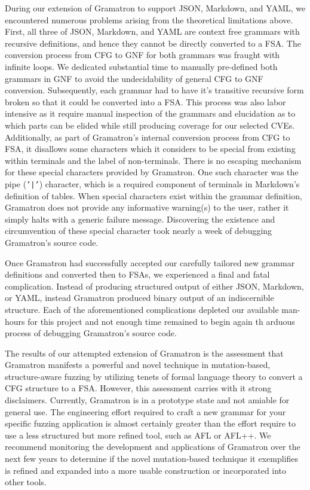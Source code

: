 \documentclass[12pt]{diazessay}
\begin{document}
During our extension of Gramatron to support JSON, Markdown, and YAML, we encountered numerous problems arising from the theoretical limitations above.
First, all three of JSON, Markdown, and YAML are context free grammars with recursive definitions, and hence they cannot be directly converted to a FSA.
The conversion process from CFG to GNF for both grammars was fraught with infinite loops.
We dedicated substantial time to manually pre-defined both grammars in GNF to avoid the undecidability of general CFG to GNF conversion.
Subsequently, each grammar had to have it's transitive recursive form broken so that it could be converted into a FSA.
This process was also labor intensive as it require manual inspection of the grammars and elucidation as to which parts can be elided while still producing coverage for our selected CVEs.
Additionally, as part of Gramatron's internal conversion process from CFG to FSA, it disallows some characters which it considers to be special from existing within terminals and the label of non-terminals.
There is no escaping mechanism for these special characters provided by Gramatron.
One such character was the pipe (\texttt{'|'}) character, which is a required component of terminals in Markdown's definition of tables.
When special characters exist within the grammar definition, Gramatron does not provide any informative warning(s) to the user, rather it simply halts with a generic failure message.
Discovering the existence and circumvention of these special character took nearly a week of debugging Gramatron's source code.

Once Gramatron had successfully accepted our carefully tailored new grammar definitions and converted then to FSAs, we experienced a final and fatal complication.
Instead of producing structured output of either JSON, Markdown, or YAML, instead Gramatron produced binary output of an indiscernible structure.
Each of the aforementioned complications depleted our available man-hours for this project and not enough time remained to begin again th arduous process of debugging Gramatron's source code.

The results of our attempted extension of Gramatron is the assessment that Gramatron manifests a powerful and novel technique in mutation-based, structure-aware fuzzing by utilizing tenets of formal language theory to convert a CFG structure to a FSA.
However, this assessment carries with it strong disclaimers.
Currently, Gramatron is in a prototype state and not amiable for general use. 
The engineering effort required to craft a new grammar for your specific fuzzing application is almost certainly greater than the effort require to use a less structured but more refined tool, such as AFL or AFL++.
We recommend monitoring the development and applications of Gramatron over the next few years to determine if the novel mutation-based technique it exemplifies is refined and expanded into a more usable construction or incorporated into other tools.
\end{document}
